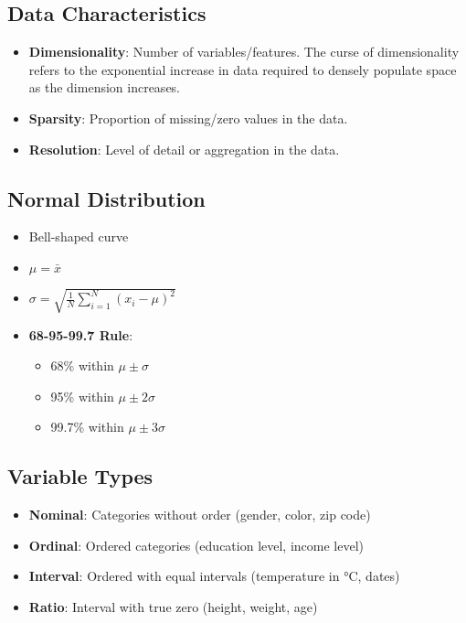 \subsection*{Data Characteristics}
\begin{itemize}[noitemsep]
    \item \textbf{Dimensionality}: Number of variables/features. The curse of dimensionality refers to the exponential increase in data required to densely populate space as the dimension increases.
    \item \textbf{Sparsity}: Proportion of missing/zero values in the data.
    \item \textbf{Resolution}: Level of detail or aggregation in the data.
\end{itemize}

\subsection*{Normal Distribution}
\begin{itemize}[noitemsep]
    \item Bell-shaped curve
    \item $\mu = \bar{x}$
    \item $\sigma = \sqrt{\frac{1}{N} \sum_{i=1}^{N} (x_i - \mu)^2}$
    \item \textbf{68-95-99.7 Rule}:
    \begin{itemize}
        \item 68\% within $\mu \pm \sigma$
        \item 95\% within $\mu \pm 2\sigma$
        \item 99.7\% within $\mu \pm 3\sigma$
    \end{itemize}
\end{itemize}

\subsection*{Variable Types}
\begin{itemize}[noitemsep]
    \item \textbf{Nominal}: Categories without order (gender, color, zip code)
    \item \textbf{Ordinal}: Ordered categories (education level, income level)
    \item \textbf{Interval}: Ordered with equal intervals (temperature in °C, dates)
    \item \textbf{Ratio}: Interval with true zero (height, weight, age)
\end{itemize}

